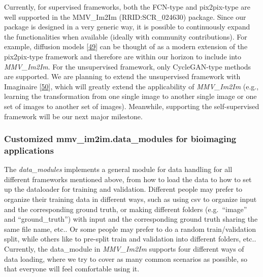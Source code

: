 Currently, for supervised frameworks, both the FCN-type and pix2pix-type are well supported in the MMV\_Im2Im (RRID:SCR\_024630) package. Since our package is designed in a very generic way, it is possible to continuously expand the functionalities when available (ideally with community contributions). For example, diffusion models {[}\protect\hyperlink{ref-1A3yurr7m}{49}{]} can be thought of as a modern extension of the pix2pix-type framework and therefore are within our horizon to include into \emph{MMV\_Im2Im}. For the unsupervised framework, only CycleGAN-type methods are supported. We are planning to extend the unsupervised framework with Imaginaire {[}\protect\hyperlink{ref-vzOBQiEH}{50}{]}, which will greatly extend the applicability of \emph{MMV\_Im2Im} (e.g., learning the transformation from one single image to another single image or one set of images to another set of images). Meanwhile, supporting the self-supervised framework will be our next major milestone.

\hypertarget{customized-mmv_im2im.data_modules-for-bioimaging-applications}{%
\subsubsection{Customized mmv\_im2im.data\_modules for bioimaging applications}\label{customized-mmv_im2im.data_modules-for-bioimaging-applications}}

The \emph{data\_modules} implements a general module for data handling for all different frameworks mentioned above, from how to load the data to how to set up the dataloader for training and validation. Different people may prefer to organize their training data in different ways, such as using csv to organize input and the corresponding ground truth, or making different folders (e.g.~``image'' and ``ground\_truth'') with input and the corresponding ground truth sharing the same file name, etc.. Or some people may prefer to do a random train/validation split, while others like to pre-split train and validation into different folders, etc.. Currently, the data\_module in \emph{MMV\_Im2Im} supports four different ways of data loading, where we try to cover as many common scenarios as possible, so that everyone will feel comfortable using it.

